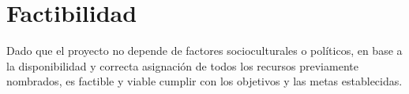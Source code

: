 \section{Factibilidad}

Dado que el proyecto no depende de factores socioculturales o políticos, en base a la disponibilidad y correcta asignación
de todos los recursos previamente nombrados, es factible y viable cumplir con los objetivos y las metas establecidas. 